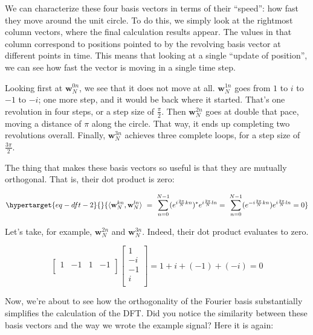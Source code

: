 \documentclass[
  letterpaper,
]{krantz}
\begin{document}
We can characterize these four basis vectors in terms of their
``speed'': how fast they move around the unit
circle. To do this, we
simply look at the rightmost column vectors, where the final calculation
results appear. The values in that column correspond to positions
pointed to by the revolving basis vector at different points in time.
This means that looking at a single ``update of position'', we can see
how fast the vector is moving in a single time step.

Looking first at \(\mathbf{w}^{0n}_N\), we see that it does not move at
all. \(\mathbf{w}^{1n}_N\) goes from \(1\) to \(i\) to \(-1\) to \(-i\);
one more step, and it would be back where it started. That's one
revolution in four steps, or a step size of \(\frac{\pi}{2}\). Then
\(\mathbf{w}^{2n}_N\) goes at double that pace, moving a distance of
\(\pi\) along the circle. That way, it ends up completing two
revolutions overall. Finally, \(\mathbf{w}^{3n}_N\) achieves three
complete loops, for a step size of \(\frac{3 \pi}{2}\).

The thing that makes these basis vectors so useful is that they are
mutually orthogonal. That is, their dot product is zero:

\begin{equation}\protect\hypertarget{eq-dft-2}{}{
\langle \mathbf{w}^{kn}_N, \mathbf{w}^{ln}_N \rangle \ = \ \sum_{n=0}^{N-1} ({e^{i\frac{2 \pi}{N}k n}})^* e^{i\frac{2 \pi}{N}l n} = \ \sum_{n=0}^{N-1} ({e^{-i\frac{2 \pi}{N}k n}})e^{i\frac{2 \pi}{N}l n} = 0
}\label{eq-dft-2}\end{equation}

Let's take, for example, \(\mathbf{w}^{2n}_N\) and
\(\mathbf{w}^{3n}_N\). Indeed, their dot product evaluates to zero.

\[
\begin{bmatrix}
   1 & -1 & 1 & -1\\
\end{bmatrix}
\begin{bmatrix}
   1\\
   -i\\
   -1\\
   i\\
\end{bmatrix}
=
1 + i + (-1) + (-i)  = 0
\]

Now, we're about to see how the orthogonality of the Fourier basis
substantially simplifies the calculation of the
DFT. Did you
notice the similarity between these basis vectors and the way we wrote
the example signal? Here it is again:
\end{document}
